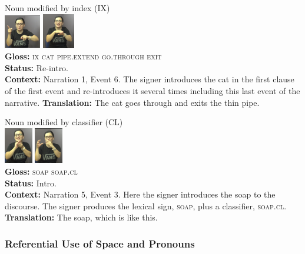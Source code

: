 \documentclass[review]{elsarticle} %
\begin{document}
\begin{exe}
\begin{xlist}
\ex \label{ex:2c} Noun modified by index (IX) \\\glll
{} \includegraphics[width=45pt]{pictures/p3.1.png} \includegraphics[width=40pt]{pictures/p3.2.png} {} {} {} \\ \textbf{Gloss:} \textsc{ix} \textsc{cat} \textsc{pipe.extend} \textsc{go.through} \textsc{exit} \\ 
\textbf{Status:} Re-intro. \\
\glt \textbf{Context:} Narration 1, Event 6. The signer introduces the cat in the first clause of the first event and re-introduces it several times including this last event of the narrative.
\glt \textbf{Translation:} The cat goes through and exits the thin pipe.
\vspace{0.35cm}

\ex \label{ex:2d} Noun modified by classifier (CL) \\\glll
{} \includegraphics[width=35pt]{pictures/p4.1.png} \includegraphics[width=35pt]{pictures/p4.2.png} \\ \textbf{Gloss:} \textsc{soap} \textsc{soap.cl} \\ 
\textbf{Status:} Intro. \\
\glt \textbf{Context:} Narration 5, Event 3. Here the signer introduces the soap to the discourse. The signer produces the lexical sign, \textsc{soap}, plus a classifier, \textsc{soap.cl}.
\glt \textbf{Translation:} The soap, which is like this.
\end{xlist}
\end{exe}


\hypertarget{referential-use-of-space-and-pronouns}{%
\subsubsection{Referential Use of Space and
Pronouns}\label{referential-use-of-space-and-pronouns}}
\end{document}
